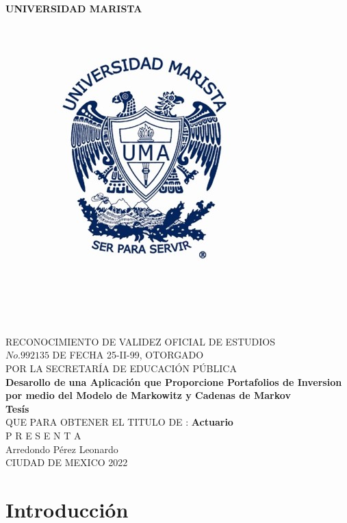\documentclass[12pt,a4paper]{article}
\begin{document}
\begin{center}
\textbf{UNIVERSIDAD MARISTA}
\begin{figure}[htb]
	\centering
	\includegraphics[scale=1.1]{logo_marista_trabajo_titulacion.jpg}
\end{figure}\\
RECONOCIMIENTO DE  VALIDEZ OFICIAL  DE ESTUDIOS\\
 $No. 992135$ DE FECHA 25-II-99, OTORGADO \\
POR LA SECRETARÍA DE EDUCACIÓN PÚBLICA \\
\textbf{Desarollo de una Aplicación que Proporcione Portafolios de Inversion  por medio  del Modelo de Markowitz y Cadenas de Markov}\\

\textbf{Tesís}\\
QUE PARA OBTENER EL TITULO DE : \textbf{Actuario}\\
P R E S E N T A\\
Arredondo Pérez Leonardo\\
CIUDAD DE MEXICO 2022\\
\end{center}
\newpage
	\tableofcontents
	\newpage
		\section{Introducción}
\end{document}
